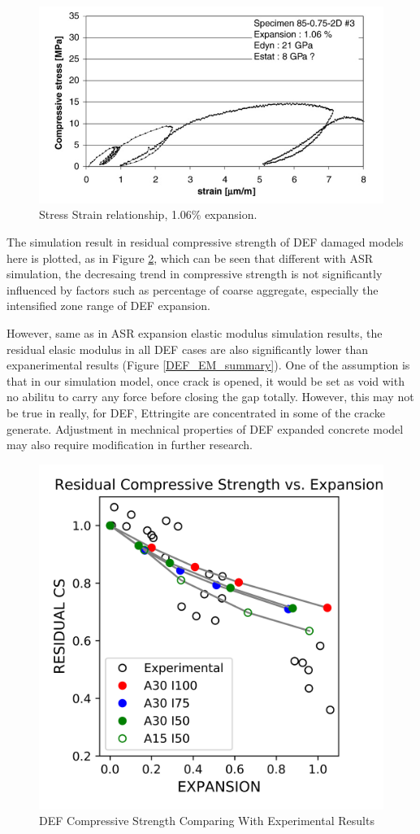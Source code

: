 \begin{figure}[ht!]
\centering
\includegraphics[width=.8\linewidth]{Reference/BruetaudLoadDisp2.png}
  \caption{Stress Strain relationship, 1.06\% expansion.}
  \label{BruetaudLoadDisp2}
\end{figure}

\clearpage

The simulation result in residual compressive strength of DEF damaged models here is plotted, as in Figure \ref{DEF_CS_summary}, which can be seen that different with ASR simulation, the decresaing trend in compressive strength is not significantly influenced by factors such as percentage of coarse aggregate, especially the intensified zone range of DEF expansion.

However, same as in ASR expansion elastic modulus simulation results, the residual elasic modulus in all DEF cases are also significantly lower than expanerimental results (Figure \ref{DEF_EM_summary}). One of the assumption is that in our simulation model, once crack is opened, it would be set as void with no abilitu to carry any force before closing the gap totally. However, this may not be true in really, for DEF, Ettringite are concentrated in some of the cracke generate. Adjustment in mechnical properties of DEF expanded concrete model may also require modification in further research.

\begin{figure}[ht!]
\centering
\includegraphics[width=.8\linewidth]{Files/CS_plot/DEFCS_all.png}
  \caption{DEF Compressive Strength Comparing With Experimental Results}
  \label{DEF_CS_summary}
\end{figure}

